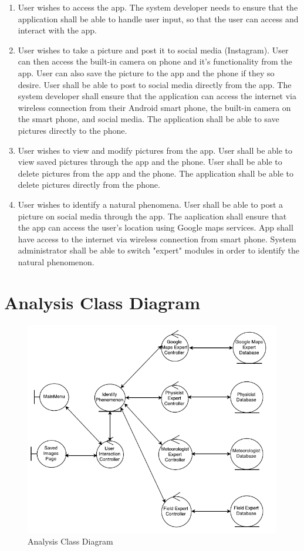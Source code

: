 \documentclass[]{article}
\begin{document}
\begin{enumerate}
	\item User wishes to access the app. The system developer needs to ensure that the application shall be able to handle user input, so that the user can access and interact with the app.
	\item User wishes to take a picture and post it to social media (Instagram).  User can then access the built-in camera on phone and it's functionality from the app.  User can also save the picture to the app and the phone if they so desire.  User shall be able to post to social media directly from the app.  The system developer shall ensure that the application can access the internet via wireless connection from their Android smart phone, the built-in camera on the smart phone, and social media.  The application shall be able to save pictures directly to the phone.
	\item User wishes to view and modify pictures from the app.  User shall be able to view saved pictures through the app and the phone.  User shall be able to delete pictures from the app and the phone.  The application shall be able to delete pictures directly from the phone.
	\item User wishes to identify a natural phenomena. User shall be able to post a picture on social media through the app.  The aaplication shall ensure that the app can access the user's location using Google maps services. App shall have access to the internet via wireless connection from smart phone. System administrator shall be able to switch "expert" modules in order to identify the natural phenomenon. 
\end{enumerate}

\section{Analysis Class Diagram}

\begin{figure}[!hb]
	\includegraphics[width=\linewidth]{AnalysisClassDiagramModified.png}
	\caption{Analysis Class Diagram}
\end{figure}
\end{document}
